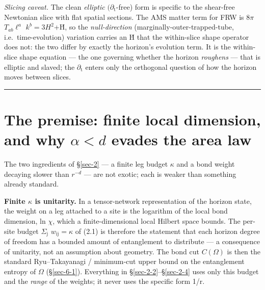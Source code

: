 \documentclass[aps,prd,preprint,nofootinbib,superscriptaddress]{revtex4-2}
\begin{document}
\emph{Slicing caveat.} The clean \emph{elliptic}
\((\partial _{\mathrm{t}}\)-free) form is specific to the shear-free
Newtonian slice with flat spatial sections. The AMS matter term for FRW
is \(8\pi\) \(T_{ab}\ell ^{a}\) \(k^{b} = 3H^{2}\)+Ḣ, so the
\emph{null-direction} (marginally-outer-trapped-tube,
i.e.~time-evolution) variation carries an Ḣ that the within-slice shape
operator does not: the two differ by exactly the horizon's evolution
term. It is the within-slice shape equation --- the one governing
whether the horizon \emph{roughens} --- that is elliptic and slaved; the
\(\partial _{\mathrm{t}}\) enters only the orthogonal question of how
the horizon moves between slices.

\begin{center}\rule{0.5\linewidth}{0.5pt}\end{center}

\section{\texorpdfstring{The premise: finite local dimension, and why
\(\alpha  < d\) evades the area
law}{The premise: finite local dimension, and why \textbackslash alpha  \textless{} d evades the area law}}\label{sec-3}

The two ingredients of §\ref{sec-2} --- a finite leg budget \(\kappa\)
and a bond weight decaying slower than \(r^{-d}\) --- are not exotic;
each is weaker than something already standard.

\textbf{Finite \(\kappa\) is unitarity.} In a tensor-network
representation of the horizon state, the weight on a leg attached to a
site is the logarithm of the local bond dimension, ln \(\chi\), which a
finite-dimensional local Hilbert space bounds. The per-site budget
\(\Sigma _{\mathrm{j}}\) \(w_{\mathrm{ij}} = \kappa\) of (2.1) is
therefore the statement that each horizon degree of freedom has a
bounded amount of entanglement to distribute --- a consequence of
unitarity, not an assumption about geometry. The bond cut \(C(\Omega )\)
is then the standard Ryu--Takayanagi / minimum-cut upper bound on the
entanglement entropy of \(\Omega\) (§\ref{sec-6-1}). Everything in
§\ref{sec-2-2}--§\ref{sec-2-4} uses only this budget and the
\emph{range} of the weights; it never uses the specific form 1/r.
\end{document}
